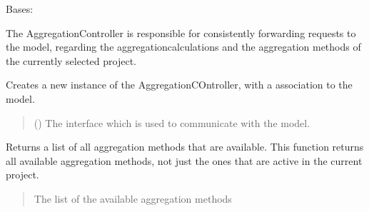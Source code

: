 \documentclass[letterpaper,10pt,english]{sphinxmanual}
\begin{document}
\begin{fulllineitems}
\label{\detokenize{apidoc/src.osm_configurator.control:src.osm_configurator.control.aggregation_controller.AggregationController}}
\pysigstartsignatures
{}
\pysigstopsignatures
\sphinxAtStartPar
Bases: 

\sphinxAtStartPar
The AggregationController is responsible for consistently forwarding requests to the model, regarding the aggregation\sphinxhyphen{}calculations and the aggregation methods of the currently selected project.

\begin{fulllineitems}
\label{\detokenize{apidoc/src.osm_configurator.control:src.osm_configurator.control.aggregation_controller.AggregationController.__init__}}
\pysigstartsignatures
{}
\pysigstopsignatures
\sphinxAtStartPar
Creates a new instance of the AggregationCOntroller, with a association to the model.
\begin{quote}\begin{description}
\sphinxAtStartPar
{} ({\hyperref[\detokenize{apidoc/src.osm_configurator.model.application:src.osm_configurator.model.application.application_interface.IApplication}]{}}) \textendash{} The interface which is used to communicate with the model.

\end{description}\end{quote}

\end{fulllineitems}


\begin{fulllineitems}
\label{\detokenize{apidoc/src.osm_configurator.control:src.osm_configurator.control.aggregation_controller.AggregationController.get_aggregation_methods}}
\pysigstartsignatures
{}
\pysigstopsignatures
\sphinxAtStartPar
Returns a list of all aggregation methods that are available.
This function returns all available aggregation methods, not just the ones that are active in the current project.
\begin{quote}\begin{description}
\sphinxAtStartPar
The list of the available aggregation methods


\end{description}
\end{quote}
\end{fulllineitems}
\end{fulllineitems}
\end{document}
